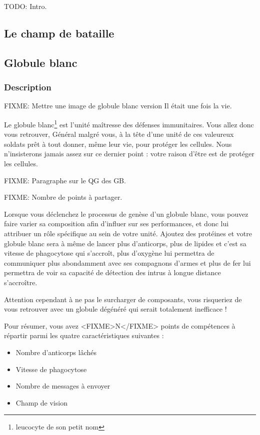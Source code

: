 \documentclass[a4paper,twoside,12pt]{article}
\begin{document}
TODO: Intro.

  \subsection{Le champ de bataille}

  \subsection{Globule blanc}

    \subsubsection{Description}

    FIXME: Mettre une image de globule blanc version Il était une fois la vie.

    Le globule blanc\footnote{leucocyte de son petit nom} est l'unité maîtresse
    des défenses immunitaires. Vous allez donc vous retrouver, Général malgré
    vous, à la tête d'une unité de ces valeureux soldats prêt à tout donner,
    même leur vie, pour protéger les cellules. Nous n'insisterons jamais assez
    sur ce dernier point : votre raison d'être est de protéger les cellules.

    FIXME: Paragraphe sur le QG des GB.

    FIXME: Nombre de points à partager.

    Lorsque vous déclenchez le processus de genèse d'un globule blanc, vous
    pouvez faire varier sa composition afin d'influer sur ses performances, et
    donc lui attribuer un rôle spécifique au sein de votre unité. Ajoutez des
    protéines et votre globule blanc sera à même de lancer plus d'anticorps,
    plus de lipides et c'est sa vitesse de phagocytose qui s'accroît, plus
    d'oxygène lui permettra de communiquer plus abondamment avec ses compagnons
    d'armes et plus de fer lui permettra de voir sa capacité de détection
    des intrus à longue distance s'accroître.

    Attention cependant à ne pas le surcharger de composants, vous risqueriez de
    vous retrouver avec un globule dégénéré qui serait totalement inefficace !

    Pour résumer, vous avez <FIXME>N</FIXME> points de compétences à répartir
    parmi les quatre caractéristiques suivantes :

    \begin{itemize}
      \item Nombre d'anticorps lâchés
      \item Vitesse de phagocytose
      \item Nombre de messages à envoyer
      \item Champ de vision
    \end{itemize}
\end{document}
